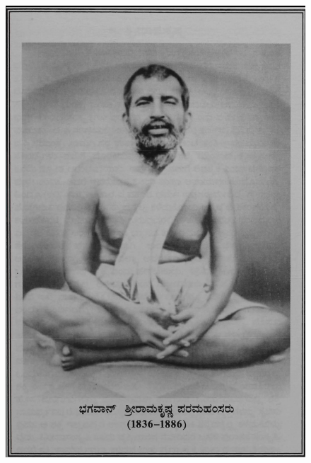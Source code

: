 \newpage

\emptypage

\begin{figure}[!hp]
\centering
\includegraphics[scale=0.87]{images/1.jpeg}
\end{figure}

